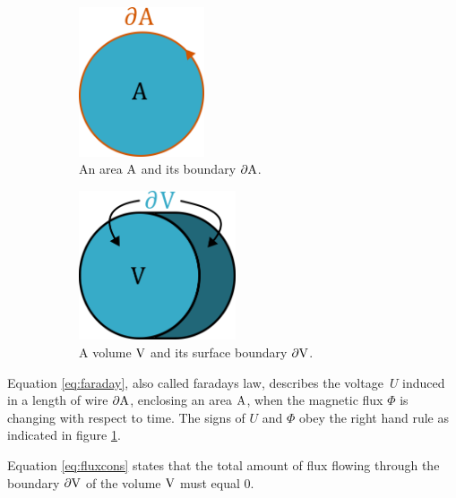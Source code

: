 \begin{figure}
    \centering
    \begin{subfigure}[b]{0.4\textwidth}
        \centering
        \includegraphics[height=125pt]{figs/partialA}
        \caption{An area $\mathrm{A}$ and its boundary $\partial \mathrm{A}$. }
        \label{fig:partialA}
    \end{subfigure}
    \hfill
    \begin{subfigure}[b]{0.4\textwidth}
        \centering
        \includegraphics[height=125pt]{figs/partialV}
        \caption{A volume $\mathrm{V}$ and its surface boundary $\partial \mathrm{V}$.}
        \label{fig:partialV}
    \end{subfigure}
    \caption{}
\end{figure}
Equation \ref{eq:faraday}, also called faradays law, describes the voltage\
$U$ induced in a length of wire $\partial\mathrm{A}$, enclosing an area
$\mathrm{A}$, when the magnetic flux $\Phi$ is changing with respect to time.
The signs of $U$ and $\Phi$ obey the right hand rule as indicated
in figure \ref{fig:partialA}.

Equation \ref{eq:fluxcons} states that the total amount of flux flowing
through the boundary $\partial\mathrm{V}$ of the volume
$\mathrm{V}$ must equal 0.\cite[Ch.4.1.1]{russenschuck_field_2011}

